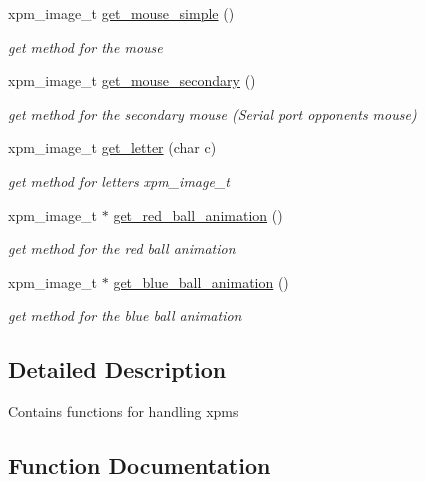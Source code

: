 \begin{DoxyCompactItemize}
xpm\+\_\+image\+\_\+t \hyperlink{group__XPM_gaa1969bef6924610fa26b58c27926b3ee}{get\+\_\+mouse\+\_\+simple} ()
\begin{DoxyCompactList}\small\item\em get method for the mouse \end{DoxyCompactList}\item 
xpm\+\_\+image\+\_\+t \hyperlink{group__XPM_gaec66ab419acf718b6b5b4234723b281c}{get\+\_\+mouse\+\_\+secondary} ()
\begin{DoxyCompactList}\small\item\em get method for the secondary mouse (Serial port opponent\textquotesingle{}s mouse) \end{DoxyCompactList}\item 
xpm\+\_\+image\+\_\+t \hyperlink{group__XPM_gaeaf4a2c369709099c0355fca8ecbd497}{get\+\_\+letter} (char c)
\begin{DoxyCompactList}\small\item\em get method for letters xpm\+\_\+image\+\_\+t \end{DoxyCompactList}\item 
xpm\+\_\+image\+\_\+t $\ast$ \hyperlink{group__XPM_ga8420f7ea3d894b635a6766e7a73ba288}{get\+\_\+red\+\_\+ball\+\_\+animation} ()
\begin{DoxyCompactList}\small\item\em get method for the red ball animation \end{DoxyCompactList}\item 
xpm\+\_\+image\+\_\+t $\ast$ \hyperlink{group__XPM_gaa3caf6e5d8c0178d8267a0d56408169f}{get\+\_\+blue\+\_\+ball\+\_\+animation} ()
\begin{DoxyCompactList}\small\item\em get method for the blue ball animation \end{DoxyCompactList}\end{DoxyCompactItemize}


\subsection{Detailed Description}
Contains functions for handling xpms 

\subsection{Function Documentation}
\mbox{\label{group__XPM_ga2fc6c9c4a09c9d990267ef2e961e133b}} 
